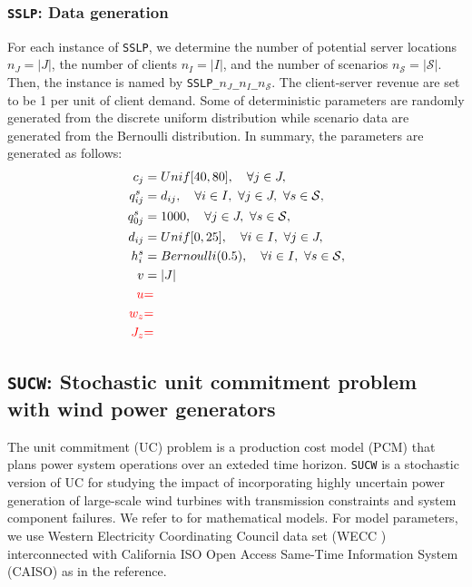 \subsubsection{\texttt{SSLP}: Data generation}
For each instance of \texttt{SSLP}, we determine the number of potential server locations $n_J=|J|$, the number of clients $n_I=|I|$, and the number of scenarios $n_\mathcal{S}=|\mathcal{S}|$. Then, the instance is named by \texttt{SSLP\_$n_J$\_$n_I$\_$n_\mathcal{S}$}. The client-server revenue are set to be 1 per unit of client demand. Some of deterministic parameters are randomly generated from the discrete uniform distribution while scenario data are generated from the Bernoulli distribution. In summary, the parameters are generated as follows:
\begin{align*}
c_j	&=Unif[40,80],\quad\forall j\in J,\\
q_{ij}^s	&= d_{ij},\quad\forall i\in I,\ \forall j\in J,\ \forall s\in\mathcal{S},\\
q_{0j}^s	&=	1000,\quad\forall j\in J,\ \forall s\in\mathcal{S},\\
d_{ij}	&= Unif[0,25],\quad\forall i\in I,\ \forall j\in J,\\
h_i^s	&= Bernoulli(0.5),\quad\forall i\in I,\ \forall s\in \mathcal{S},\\
v 		&= |J|	\\
\textcolor{red}{u	}&\textcolor{red}{=		}\\
\textcolor{red}{w_z	}&\textcolor{red}{=		}\\
\textcolor{red}{J_z	}&\textcolor{red}{=	}
\end{align*}

\subsection{\texttt{SUCW}: Stochastic unit commitment problem with wind power generators} \label{SUCW}
The unit commitment (UC) problem is a production cost model (PCM) that plans power system operations over an exteded time horizon. \texttt{SUCW} is a stochastic version of UC for studying the impact of incorporating highly uncertain power generation of large-scale wind turbines with transmission constraints and system component failures. We refer to \cite{journal:PO2013} for mathematical models. For model parameters, we use Western Electricity Coordinating Council data set (WECC \cite{wecc}) interconnected with California ISO Open Access Same-Time Information System (CAISO) as in the reference. 
